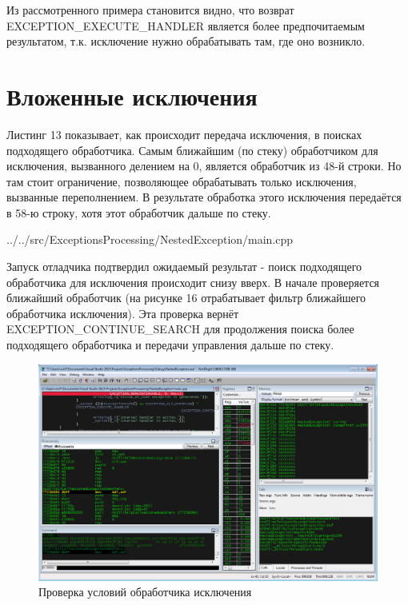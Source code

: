 \documentclass[a4paper, 12pt]{report}		%
\begin{document}


Из рассмотренного примера становится видно, что возврат EXCEPTION\_EXECUTE\_HANDLER является более предпочитаемым результатом, т.к. исключение нужно обрабатывать там, где оно возникло.


\chapter*{Вложенные исключения}

Листинг 13 показывает, как происходит передача исключения, в поисках подходящего обработчика. Самым ближайшим (по стеку) обработчиком для исключения, вызванного делением на 0, является обработчик из 48-й строки. Но там стоит ограничение, позволяющее обрабатывать только исключения, вызванные переполнением. В результате обработка этого исключения передаётся в 58-ю строку, хотя этот обработчик дальше по стеку.


{../../src/ExceptionsProcessing/NestedException/main.cpp}

Запуск отладчика подтвердил ожидаемый результат - поиск подходящего обработчика для исключения происходит снизу вверх. В начале проверяется ближайший обработчик (на рисунке 16 отрабатывает фильтр ближайшего обработчика исключения). Эта проверка вернёт EXCEPTION\_CONTINUE\_SEARCH для продолжения поиска более подходящего обработчика и передачи управления дальше по стеку\cite{Dushutina}.
\newpage

\begin{figure}[h!]
\centering
\includegraphics[scale=0.50]{res/009}
\caption{Проверка условий обработчика исключения}
\end{figure}
\end{document}

